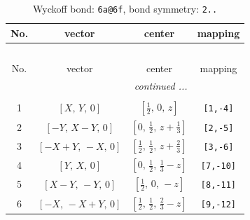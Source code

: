 \documentclass[fleqn,8pt]{jsarticle}
\begin{document}
\renewcommand{\arraystretch}{1.2}
\begin{longtable}{cccc}
\caption{Wyckoff bond: {\tt 6a@6f}, bond symmetry: {\tt 2..}}
 \\
 \hline \hline
No. & vector & center & mapping \\ \hline \endfirsthead

\multicolumn{3}{l}{\tablename\ \thetable{}} \\
 \hline \hline
No. & vector & center & mapping \\ \hline \endhead

 \hline \hline
\multicolumn{3}{r}{\footnotesize\it continued ...} \\ \endfoot

 \hline \hline
\multicolumn{3}{r}{} \\ \endlastfoot

1 & $\left[ X,\, Y,\, 0 \right]$ & $\left[ \frac{1}{2},\, 0,\, z \right]$ & {\tt [1,-4]} \\ \hline
2 & $\left[ - Y,\, X - Y,\, 0 \right]$ & $\left[ 0,\, \frac{1}{2},\, z + \frac{1}{3} \right]$ & {\tt [2,-5]} \\ \hline
3 & $\left[ - X + Y,\, - X,\, 0 \right]$ & $\left[ \frac{1}{2},\, \frac{1}{2},\, z + \frac{2}{3} \right]$ & {\tt [3,-6]} \\ \hline
4 & $\left[ Y,\, X,\, 0 \right]$ & $\left[ 0,\, \frac{1}{2},\, \frac{1}{3} - z \right]$ & {\tt [7,-10]} \\ \hline
5 & $\left[ X - Y,\, - Y,\, 0 \right]$ & $\left[ \frac{1}{2},\, 0,\, - z \right]$ & {\tt [8,-11]} \\ \hline
6 & $\left[ - X,\, - X + Y,\, 0 \right]$ & $\left[ \frac{1}{2},\, \frac{1}{2},\, \frac{2}{3} - z \right]$ & {\tt [9,-12]} \\
\end{longtable}
\renewcommand{\arraystretch}{1.2}
\end{document}
